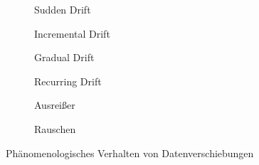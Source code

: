 \begin{figure}[ht!]
    \centering
    \begin{subfigure}[b]{0.345\textwidth}
        \centering
        
        \caption{Sudden Drift}
        \label{fig:phenomenon_sudden_drift}
    \end{subfigure}
    \hspace{-2em}
    \begin{subfigure}[b]{0.345\textwidth}
        \centering
        
        \caption{Incremental Drift}
        \label{fig:phenomenon_incremental_drift}
    \end{subfigure}
    \hspace{-2em}
    \begin{subfigure}[b]{0.345\textwidth}
        \centering
        
        \caption{Gradual Drift}
        \label{fig:phenomenon_gradual_drift}
    \end{subfigure}
    

    \begin{subfigure}[b]{0.345\textwidth}
        \centering
        
        \caption{Recurring Drift}
        \label{fig:phenomenon_recurring_drift}
    \end{subfigure}
    \hspace{-2em}
    \begin{subfigure}[b]{0.345\textwidth}
        \centering
        
        \caption{Ausreißer}
        \label{fig:phenomenon_outlier}
    \end{subfigure}
    \hspace{-2em}
    \begin{subfigure}[b]{0.345\textwidth}
        \centering
        
        \caption{Rauschen}
        \label{fig:phenomenon_noise}
    \end{subfigure}

    \caption{Phänomenologisches Verhalten von Datenverschiebungen}
    \label{fig:phenomenon}
\end{figure}
%
